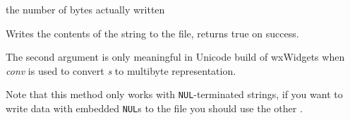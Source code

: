 the number of bytes actually written


\label{wxfilewrites}


Writes the contents of the string to the file, returns true on success.

The second argument is only meaningful in Unicode build of wxWidgets when
{\it conv} is used to convert {\it s} to multibyte representation.

Note that this method only works with {\tt NUL}-terminated strings, if you want
to write data with embedded {\tt NUL}s to the file you should use the other 
.

